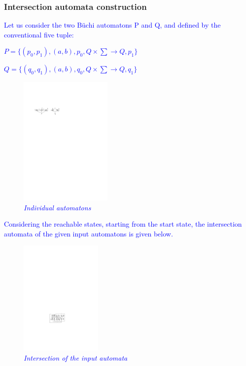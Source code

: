 \begin{frame}
\frametitle{Intersection automata construction}

 \tiny{\textcolor{blue}{Let us consider the two B\"{u}chi automatons P and Q, %
and defined by the conventional five tuple:}}

\tiny{\textcolor{blue}{$P = \{(p_0,p_1),(a,b),p_0, Q \times \sum \rightarrow Q,p_1\}$}}

\tiny{\textcolor{blue}{$Q = \{(q_0,q_1),(a,b),q_0, Q \times \sum \rightarrow Q,q_1\}$}}



\begin{figure}
\begin{center}
\includegraphics[width=45mm]{example_1.pdf}
\end{center}
\caption{{\em \tiny{\textcolor{blue}{Individual automatons}}}} \label{fig1}
\end{figure}


\tiny{\textcolor{blue}{Considering  the reachable states, starting from the start 
state, the intersection automata of the given input automatons is given below.}}


 \begin{figure}
\begin{center}
\includegraphics[width=40mm]{state_copy_transition.pdf}
\end{center}
\caption{{\em\tiny{\textcolor{blue}{ Intersection of the input automata}}}}
\label{transition}
\end{figure}
% 
 


\end{frame}
